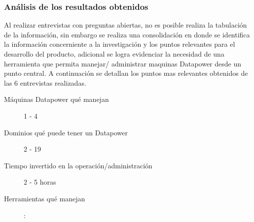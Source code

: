 \subsubsection{Análisis de los resultados obtenidos}
Al realizar entrevistas con preguntas abiertas, no es posible realiza la tabulación de la información, sin embargo se realiza una consolidación en donde se identifica la información concerniente a la investigación y los puntos relevantes para el desarrollo del producto, adicional se logra evidenciar la necesidad de una herramienta que permita manejar/ administrar maquinas Datapower desde un punto central.
\newline
A continuación se detallan los puntos mas relevantes obtenidos de las 6 entrevistas realizadas.
\begin{description}
\item [Máquinas Datapower qué manejan] 1 - 4
\item [Dominios qué puede tener un Datapower] 2 - 19
\item [Tiempo invertido en la operación/administración] 2 - 5 horas
\item [Herramientas qué manejan] : 


\end{description}
